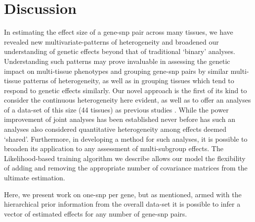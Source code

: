 \section{Discussion}

In estimating the effect size of a gene-snp pair across many tissues, we have revealed new multivariate-patterns of heterogeneity and broadened our understanding of genetic effects beyond that of traditional `binary' analyses. Understanding such patterns may prove invaluable in assessing the genetic impact on multi-tissue phenotypes and grouping gene-snp pairs by similar multi-tissue patterns of heterogeneity, as well as in grouping tissues which tend to respond to genetic effects similarly. Our novel approach is the first of its kind to consider the continuous heterogeneity here evident, as well as to offer an analyses of a data-set of this size (44 tissues) as previous studies \cite{consortium_genotype-tissue_2015}. While the power improvement of joint analyses has been established \cite{flutre_statistical_2013} never before has such an analyses also considered quantitative heterogeneity among effects deemed `shared'. Furthermore, in developing a method for such analyses, it is possible to broaden its application to any assessment of multi-subgroup effects. The Likelihood-based training algorithm we describe allows our model the flexibility of adding and removing the appropriate  number of covariance matrices from the ultimate estimation.

Here, we present work on one-snp per gene, but as mentioned, armed with the hierarchical prior information from the overall data-set it is possible to infer a vector of estimated effects for any number of gene-snp pairs. 
